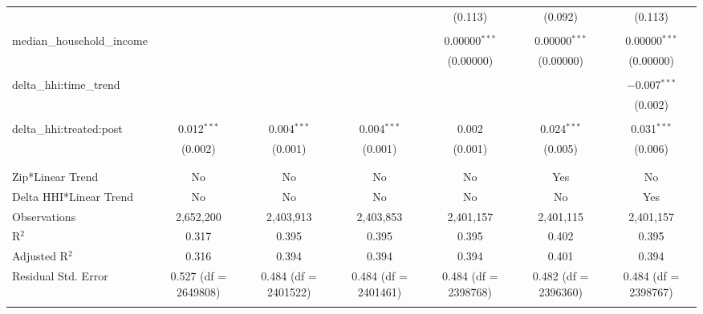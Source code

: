 \begin{table}[H]
{\begin{tabular}{@{\extracolsep{5pt}}lcccccc}
   &  &  &  & (0.113) & (0.092) & (0.113) \\  

   & & & & & & \\  

  median\_household\_income &  &  &  & 0.00000$^{***}$ & 0.00000$^{***}$ & 0.00000$^{***}$ \\  

   &  &  &  & (0.00000) & (0.00000) & (0.00000) \\  

   & & & & & & \\  

  delta\_hhi:time\_trend &  &  &  &  &  & $-$0.007$^{***}$ \\  

   &  &  &  &  &  & (0.002) \\  

   & & & & & & \\  

  delta\_hhi:treated:post & 0.012$^{***}$ & 0.004$^{***}$ & 0.004$^{***}$ & 0.002 & 0.024$^{***}$ & 0.031$^{***}$ \\  

   & (0.002) & (0.001) & (0.001) & (0.001) & (0.005) & (0.006) \\  

   & & & & & & \\  

 \hline \\[-1.8ex]  

 Zip*Linear Trend & No & No & No & No & Yes & No \\  

 Delta HHI*Linear Trend & No & No & No & No & No & Yes \\  

 Observations & 2,652,200 & 2,403,913 & 2,403,853 & 2,401,157 & 2,401,115 & 2,401,157 \\  

 R$^{2}$ & 0.317 & 0.395 & 0.395 & 0.395 & 0.402 & 0.395 \\  

 Adjusted R$^{2}$ & 0.316 & 0.394 & 0.394 & 0.394 & 0.401 & 0.394 \\  

 Residual Std. Error & 0.527 (df = 2649808) & 0.484 (df = 2401522) & 0.484 (df = 2401461) & 0.484 (df = 2398768) & 0.482 (df = 2396360) & 0.484 (df = 2398767) \\  

 \hline  

 \hline \\[-1.8ex]  


\end{tabular}}
\end{table}
